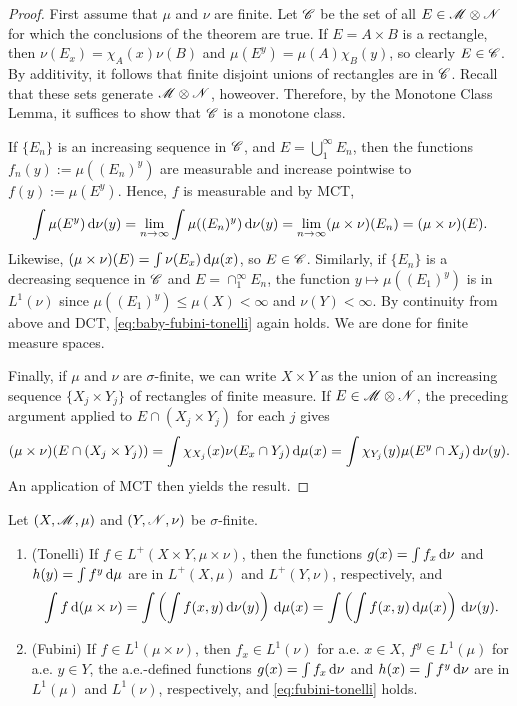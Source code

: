 \documentclass[12pt]{article} %
\begin{document}
\begin{proof}
    First assume that $\mu$ and $\nu$ are finite. Let $\mathscr{C}$ be the set of all $E \in \mathscr{M} \otimes \mathscr{N}$ for which the conclusions of the theorem are true. If $E = A \times B$ is a rectangle, then $\nu(E_x) = \chi_A(x) \nu(B)$ and $\mu(E^y) = \mu(A) \chi_B(y)$, so clearly $E \in \mathscr{C}$. By additivity, it follows that finite disjoint unions of rectangles are in $\mathscr{C}$. Recall that these sets generate $\mathscr{M} \otimes \mathscr{N}$, howeover. Therefore, by the Monotone Class Lemma, it suffices to show that $\mathscr{C}$ is a monotone class. 

    If $\{E_n\}$ is an increasing sequence in $\mathscr{C}$, and $E = \bigcup_1^\infty E_n$, then the functions $f_n(y) := \mu((E_n)^y)$ are measurable and increase pointwise to $f(y) := \mu(E^y)$. Hence, $f$ is measurable and by MCT, \begin{align}\label{eq:baby-fubini-tonelli}
        \int \mu(E^y) \, \mathrm{d} \nu(y) = \lim_{n \to \infty} \int \mu((E_n)^y) \, \mathrm{d} \nu(y) = \lim_{n \to \infty} (\mu \times \nu)(E_n) = (\mu \times \nu)(E).
    \end{align}Likewise, $(\mu \times \nu)(E) = \int \nu(E_x) \, \mathrm{d} \mu(x)$, so $E \in \mathscr{C}$. Similarly, if $\{E_n\}$ is a decreasing sequence in $\mathscr{C}$ and $E = \cap_1^\infty E_n$, the function $y \mapsto \mu((E_1)^y)$ is in $L^1(\nu)$ since $\mu((E_1)^y) \leq \mu(X) < \infty$ and $\nu(Y) < \infty$. By continuity from above and DCT, \cref{eq:baby-fubini-tonelli} again holds. We are done for finite measure spaces.

    Finally, if $\mu$ and $\nu$ are $\sigma$-finite, we can write $X \times Y$ as the union of an increasing sequence $\{X_j \times Y_j\}$ of rectangles of finite measure. If $E \in \mathscr{M} \otimes \mathscr{N}$, the preceding argument applied to $E \cap (X_j \times Y_j)$ for each $j$ gives \[(\mu \times \nu)(E \cap (X_j \times Y_j)) = \int \chi_{X_j}(x)\nu(E_x \cap Y_j) \, \mathrm{d} \mu(x) = \int \chi_{Y_j} (y) \mu (E^y \cap X_j) \, \mathrm{d} \nu(y).\] An application of MCT then yields the result.
\end{proof}

\begin{theorem}
    Let $(X, \mathscr{M}, \mu)$ and $(Y, \mathscr{N}, \nu)$ be $\sigma$-finite. \begin{enumerate}
        \item (Tonelli) If $f \in L^+(X \times Y, \mu \times \nu)$, then the functions $g(x) = \int f_x \, \mathrm{d} \nu$ and $h(y) = \int f^y \, \mathrm{d} \mu$ are in $L^+(X, \mu)$ and $L^+(Y, \nu)$, respectively, and \begin{align}\label{eq:fubini-tonelli}
            \int f \, \mathrm{d}(\mu \times \nu) = \int \left( \int f(x,y) \, \mathrm{d} \nu(y) \right) \, \mathrm{d} \mu(x) = \int \left( \int f(x, y) \, \mathrm{d} \mu(x) \right) \, \mathrm{d} \nu(y).
        \end{align}
        \item (Fubini) If $f \in L^1(\mu \times \nu)$, then $f_x \in L^1(\nu)$ for a.e. $x \in X$, $f^y \in L^1(\mu)$ for a.e. $y \in Y$, the a.e.-defined functions $g(x) = \int f_x \, \mathrm{d} \nu$ and $h(x) = \int f^y \, \mathrm{d} \nu$ are in $L^1(\mu)$ and $L^1(\nu)$, respectively, and \cref{eq:fubini-tonelli} holds.
    \end{enumerate}
\end{theorem}
\end{document}
